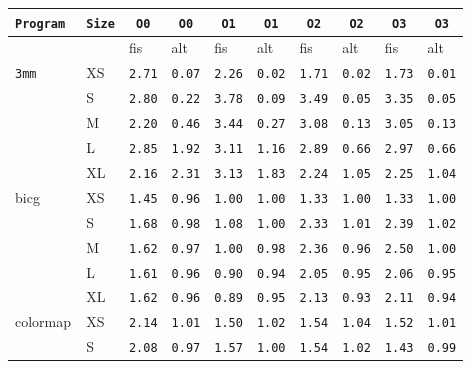 \begin{tabular}{l | l | l | l | l | l | l | l | l | l} \hline
    \verb|Program | & \verb|Size| & \verb| O0 | & \verb| O0 | & \verb| O1 | & \verb| O1 | & \verb| O2 | & \verb| O2 | & \verb| O3 | & \verb| O3 | \\ \hline
    \hline
             &      & fis  & alt  & fis  & alt  & fis  & alt  & fis  & alt  \\ \hline
    \verb|3mm     | & XS   & \verb|2.71| & \verb|0.07| & \verb|2.26| & \verb|0.02| & \verb|1.71| & \verb|0.02| & \verb|1.73| & \verb|0.01| \\ \hline
             & S    & \verb|2.80| & \verb|0.22| & \verb|3.78| & \verb|0.09| & \verb|3.49| & \verb|0.05| & \verb|3.35| & \verb|0.05| \\ \hline
             & M    & \verb|2.20| & \verb|0.46| & \verb|3.44| & \verb|0.27| & \verb|3.08| & \verb|0.13| & \verb|3.05| & \verb|0.13| \\ \hline
             & L    & \verb|2.85| & \verb|1.92| & \verb|3.11| & \verb|1.16| & \verb|2.89| & \verb|0.66| & \verb|2.97| & \verb|0.66| \\ \hline
             & XL   & \verb|2.16| & \verb|2.31| & \verb|3.13| & \verb|1.83| & \verb|2.24| & \verb|1.05| & \verb|2.25| & \verb|1.04| \\ \hline
    bicg     & XS   & \verb|1.45| & \verb|0.96| & \verb|1.00| & \verb|1.00| & \verb|1.33| & \verb|1.00| & \verb|1.33| & \verb|1.00| \\ \hline
             & S    & \verb|1.68| & \verb|0.98| & \verb|1.08| & \verb|1.00| & \verb|2.33| & \verb|1.01| & \verb|2.39| & \verb|1.02| \\ \hline
             & M    & \verb|1.62| & \verb|0.97| & \verb|1.00| & \verb|0.98| & \verb|2.36| & \verb|0.96| & \verb|2.50| & \verb|1.00| \\ \hline
             & L    & \verb|1.61| & \verb|0.96| & \verb|0.90| & \verb|0.94| & \verb|2.05| & \verb|0.95| & \verb|2.06| & \verb|0.95| \\ \hline
             & XL   & \verb|1.62| & \verb|0.96| & \verb|0.89| & \verb|0.95| & \verb|2.13| & \verb|0.93| & \verb|2.11| & \verb|0.94| \\ \hline
    colormap & XS   & \verb|2.14| & \verb|1.01| & \verb|1.50| & \verb|1.02| & \verb|1.54| & \verb|1.04| & \verb|1.52| & \verb|1.01| \\ \hline
             & S    & \verb|2.08| & \verb|0.97| & \verb|1.57| & \verb|1.00| & \verb|1.54| & \verb|1.02| & \verb|1.43| & \verb|0.99| \\ \hline

\end{tabular}
